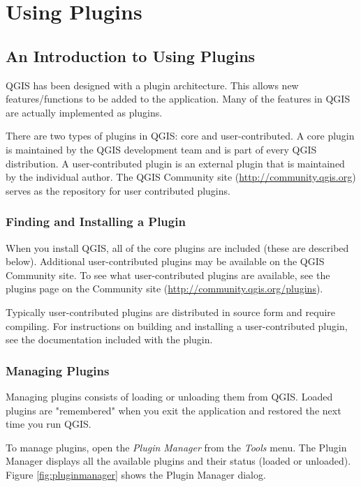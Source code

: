 \section{Using Plugins}

\subsection{An Introduction to Using Plugins}\label{label_introplugin}

QGIS has been designed with a plugin architecture. This allows new
features/functions to be added to the application. Many of the features in
QGIS are actually implemented as plugins.

There are two types of plugins in QGIS: core and user-contributed.
A core plugin is maintained by the QGIS development team
and is part of every QGIS distribution. A user-contributed plugin is an
external plugin that is maintained by the individual author. The QGIS
Community site (\url{http://community.qgis.org}) serves as the repository for
user contributed plugins.

\subsubsection{Finding and Installing a Plugin}
When you install QGIS, all of the core plugins are included (these are
described below). Additional user-contributed
plugins may be available on the QGIS Community site. To see what
user-contributed plugins are available, see the plugins page on the Community
site (\url{http://community.qgis.org/plugins}).

Typically user-contributed plugins are distributed in source form and require
compiling. For instructions on building and installing a user-contributed
plugin, see the documentation included with the plugin.

\subsubsection{Managing Plugins}\label{sec:managing_plugins} Managing plugins consists of loading or unloading them from
QGIS. Loaded plugins are "remembered" when you exit the application and
restored the next time you run QGIS.

To manage plugins, open the \textsl{Plugin Manager} from the \textsl{Tools}
menu. The Plugin Manager displays all the available
plugins and their status (loaded or unloaded). Figure \ref{fig:pluginmanager}
shows the Plugin Manager dialog.

